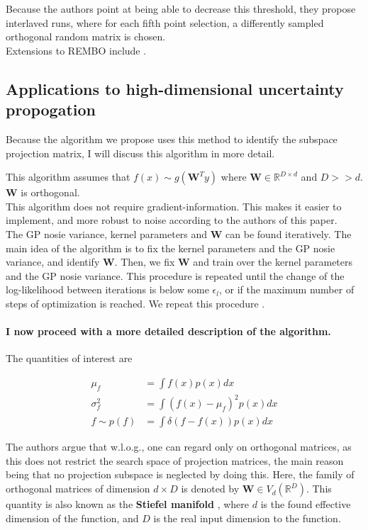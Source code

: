 Because the authors point at being able to decrease this threshold, they propose interlaved runs, where for each fifth point selection, a differently sampled orthogonal random matrix is chosen. \\

Extensions to REMBO include \citep{RemboExtension}.

\subsection{Applications to high-dimensional uncertainty propogation}
Because the algorithm we propose uses this method to identify the subspace projection matrix, I will discuss this algorithm in more detail.

\citep{Tripathy} This algorithm assumes that  $f(x) \sim g( \mathbf{W}^T y)$ where $ \mathbf{W} \in \mathbb{R}^{D \times d} $ and $D >> d$.
$ \mathbf{W} $ is orthogonal. \\

This algorithm does not require gradient-information.
This makes it easier to implement, and more robust to noise according to the authors of this paper. \\
The GP nosie variance, kernel parameters and  $ \mathbf{W} $ can be found iteratively.
The main idea of the algorithm is to fix the kernel parameters and the GP nosie variance, and identify $ \mathbf{W} $.
Then, we fix $ \mathbf{W} $ and train over the kernel parameters and the GP nosie variance.
This procedure is repeated until the change of the log-likelihood between iterations is below some $ \epsilon_l $, or if the maximum number of steps of optimization is reached.
We repeat this procedure .\\

\paragraph{I now proceed with a more detailed description of the algorithm.}
The quantities of interest are

\begin{align}
\mu_f &= \int f(x) p(x) dx \\
\sigma^2_f &= \int ( f(x) - \mu_f )^2 p(x) dx \\
f \sim p(f) &= \int \delta( f - f(x) ) p(x) dx
\end{align}

The authors argue that w.l.o.g., one can regard only on orthogonal matrices, as this does not restrict the search space of projection matrices, the main reason being that no projection subspace is neglected by doing this.
Here, the family of orthogonal matrices of dimension $d \times D$ is denoted by $\mathbf{W} \in V_d(\mathbb{R}^D) $.
This quantity is also known as the \textbf{Stiefel manifold} \citep{StiefelBayesianInference} \citep{StatisticsStiefelIntro} \citep{StiefelNonparametric}, where $d$ is the found effective dimension of the function, and $D$ is the real input dimension to the function. \\

